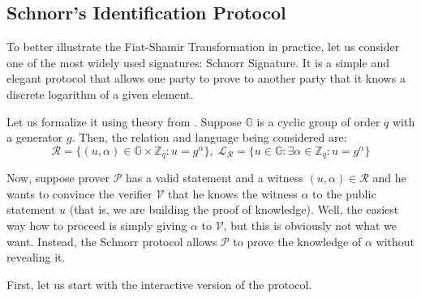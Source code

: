 \documentclass[../lecture-notes.tex]{subfiles}
\begin{document}
\subsection{Schnorr's Identification Protocol}

To better illustrate the Fiat-Shamir Transformation in practice, let us consider one of the most widely used signatures: Schnorr Signature. It is a simple and elegant protocol that allows one party to prove to another party that it knows a discrete logarithm of a given element. 

Let us formalize it using theory from . Suppose $\mathbb{G}$ is a cyclic group of order $q$ with a generator $g$. Then, the relation and language being considered are:
\begin{equation*}
    \mathcal{R} = \{(u, \alpha) \in \mathbb{G} \times \mathbb{Z}_q: u = g^{\alpha}\}, \; \mathcal{L}_{\mathcal{R}} = \{u \in \mathbb{G}: \exists \alpha \in \mathbb{Z}_q: u = g^{\alpha}\}
\end{equation*}

Now, suppose prover $\mathcal{P}$ has a valid statement and a witness $(u,\alpha) \in \mathcal{R}$ and he wants to convince the verifier $\mathcal{V}$ that he knows the witness $\alpha$ to the public statement $u$ (that is, we are building the proof of knowledge). Well, the easiest way how to proceed is simply giving $\alpha$ to $\mathcal{V}$, but this is obviously not what we want. Instead, the Schnorr protocol allows $\mathcal{P}$ to prove the knowledge of $\alpha$ without revealing it. 

First, let us start with the interactive version of the protocol. 
\end{document}
